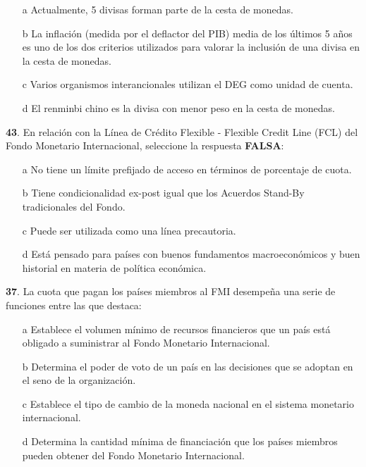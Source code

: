 \documentclass{nuevotema}
\begin{document}
\begin{enumerate}
	\item[a] Actualmente, 5 divisas forman parte de la cesta de monedas.
	\item[b] La inflación (medida por el deflactor del PIB) media de los últimos 5 años es uno de los dos criterios utilizados para valorar la inclusión de una divisa en la cesta de monedas.
	\item[c] Varios organismos interancionales utilizan el DEG como unidad de cuenta.
	\item[d] El renminbi chino es la divisa con menor peso en la cesta de monedas.
\end{enumerate}

\textbf{43}. En relación con la Línea de Crédito Flexible - Flexible Credit Line (FCL) del Fondo Monetario Internacional, seleccione la respuesta \textbf{FALSA}:

\begin{enumerate}
	\item[a] No tiene un límite prefijado de acceso en términos de porcentaje de cuota.
	\item[b] Tiene condicionalidad ex-post igual que los Acuerdos Stand-By tradicionales del Fondo.
	\item[c] Puede ser utilizada como una línea precautoria.
	\item[d] Está pensado para países con buenos fundamentos macroeconómicos y buen historial en materia de política económica.
\end{enumerate}


\textbf{37}. La cuota que pagan los países miembros al FMI desempeña una serie de funciones entre las que destaca:

\begin{enumerate}
	\item[a] Establece el volumen mínimo de recursos financieros que un país está obligado a suministrar al Fondo Monetario Internacional.
	\item[b] Determina el poder de voto de un país en las decisiones que se adoptan en el seno de la organización.
	\item[c] Establece el tipo de cambio de la moneda nacional en el sistema monetario internacional.
	\item[d] Determina la cantidad mínima de financiación que los países miembros pueden obtener del Fondo Monetario Internacional.
\end{enumerate}
\end{document}
